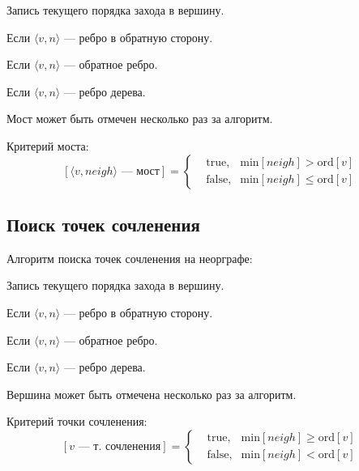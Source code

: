 \begin{list*}[][\#]
\item Запись текущего порядка захода в вершину.
\item Если $\langle v,n\rangle$ --- ребро в {\ital обратную сторону}.
\item Если $\langle v,n\rangle$ --- {\ital обратное ребро}.
\item Если $\langle v,n\rangle$ --- {\ital ребро дерева}.
\item Мост может быть отмечен {\ital несколько раз} за алгоритм.
\item Критерий моста:
$$[\langle v,neigh\rangle\text{ --- мост}]=\left\{\begin{aligned}
&\text{true}, &\text{min}[neigh]\greater\text{ord}[v]\\
&\text{false}, &\text{min}[neigh]\leq\text{ord}[v]
\end{aligned}\right.$$
\end{list*}

\subsection{Поиск точек сочленения}

{\bold Алгоритм} поиска точек сочленения на неорграфе:


\begin{list*}[][\#]
\item Запись текущего порядка захода в вершину.
\item Если $\langle v,n\rangle$ --- ребро в {\ital обратную сторону}.
\item Если $\langle v,n\rangle$ --- {\ital обратное ребро}.
\item Если $\langle v,n\rangle$ --- {\ital ребро дерева}.
\item Вершина может быть отмечена {\ital несколько раз} за алгоритм.
\item Критерий точки сочленения:
$$[v\text{ --- т. сочленения}]=\left\{\begin{aligned}
&\text{true}, &\text{min}[neigh]\geq\text{ord}[v]\\
&\text{false}, &\text{min}[neigh]\less\text{ord}[v]
\end{aligned}\right.$$
\end{list*}

